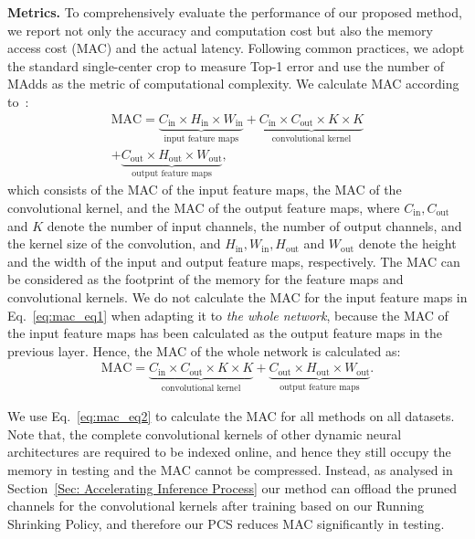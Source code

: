 \documentclass[lettersize,journal]{IEEEtran}
\begin{document}
\textbf{Metrics.} 
To comprehensively evaluate the performance of our proposed method, we report not only the accuracy and computation cost but also the memory access cost (MAC) and the actual latency. Following common practices, we adopt the standard single-center crop to measure Top-1 error and use the number of MAdds as the metric of computational complexity. We calculate MAC according to~\cite{ma2018shufflenet}:
\begin{equation}
\label{eq:mac_eq1}
\begin{aligned}
    \text{MAC}=\underbrace{C_{\text{in}}\times H_{\text{in}}\times W_{\text{in}}}_{\text{input feature maps}} + \underbrace{
    C_{\text{in}}\times C_{\text{out}}\times K\times K}_{\text{convolutional kernel}}\\ + \underbrace{C_{\text{out}}\times H_{\text{out}}\times W_{\text{out}}}_{\text{output feature maps}},
\end{aligned}
\end{equation}
which consists of the MAC of the input feature maps, the MAC of the  convolutional kernel, and the MAC of the output feature maps, where $C_{\text{in}}, C_{\text{out}}$ and $K$ denote the number of input channels, the number of output channels, and the kernel size of the convolution, and $H_{\text{in}}, W_{\text{in}}, H_{\text{out}}$ and $W_{\text{out}}$ denote the height and the width of the input and output feature maps, respectively. The MAC can be considered as the footprint of the memory for the feature maps and convolutional kernels. We do not calculate the MAC for the input feature maps in Eq.~\ref{eq:mac_eq1} when adapting it to \emph{the whole network}, because the MAC of the input feature maps has been calculated as the output feature maps in the previous layer. Hence, the MAC of the whole network is calculated as:
\begin{align}
\label{eq:mac_eq2}
    \text{MAC}=\underbrace{
    C_{\text{in}}\times C_{\text{out}}\times K\times K}_{\text{convolutional kernel}} + \underbrace{C_{\text{out}}\times H_{\text{out}}\times W_{\text{out}}}_{\text{output feature maps}}.
\end{align}

We use Eq.~\ref{eq:mac_eq2} to calculate the MAC for all methods on all datasets. 
Note that, the complete convolutional kernels of other dynamic neural architectures are required to be indexed online, and hence they still occupy the memory in testing and the MAC cannot be compressed. Instead, as analysed in Section~\ref{Sec: Accelerating Inference Process} our method can offload the pruned channels for the convolutional kernels after training based on our Running Shrinking Policy, and therefore our PCS reduces MAC significantly in testing.
\end{document}
